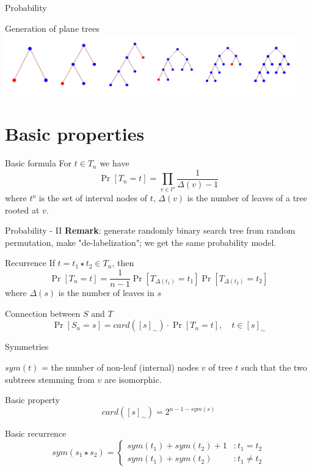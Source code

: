 \documentclass{beamer}
\begin{document}
\begin{frame}{Probability}
\begin{block}{Generation of plane trees}
\centering
\includegraphics[width=0.95\textwidth]{Trees02}
\end{block}

\section{Basic properties}

\begin{block}{Basic formula}
For $t \in T_n$ we have
$$
\Pr[T_n = t] = \prod_{v\in t^o} \frac{1}{\Delta(v)-1}
$$
where $t^o$ is the set of interval nodes of $t$, $\Delta(v)$ is the number of leaves of a tree rooted at $v$.
\end{block}

\end{frame}

\begin{frame}{Probability - II}
\textbf{Remark}: generate randomly binary search tree from random permutation, make "de-labelization"; we get the same probability model.

\begin{block}{Recurrence}
If $t = t_1 \star t_2 \in T_n$, then
$$\Pr[T_n=t] = \frac{1}{n-1} \Pr[T_{\Delta(t_1)}=t_1] \Pr[T_{\Delta(t_2)}=t_2]$$
where $\Delta(s)$ is the number of leaves in $s$
\end{block}

\begin{block}{Connection between $S$ and $T$}
$$\Pr[S_n = s] = card([s]_\sim) \cdot \Pr[T_n = t], \quad t\in [s]_\sim$$
\end{block}

\end{frame}

\begin{frame}{Symmetries}

\begin{definition}
  $sym(t)$ = the number of non-leaf (internal)
nodes $v$ of tree $t$ such that the two subtrees stemming from $v$ are isomorphic.
\end{definition}

\begin{block}{Basic property}
$$
  card([s]_\sim) = 2^{n - 1 - sym(s)}
$$
\end{block}
\begin{block}{Basic recurrence}
$$
  sym(s_1\star s_2) = 
	\begin{cases}
	sym(t_1) + sym(t_2) + 1 &: t_1   =  t_2\\
	sym(t_1) + sym(t_2)     &: t_1 \neq t_2
	\end{cases}
$$
\end{block}

\end{frame}
\end{document}
